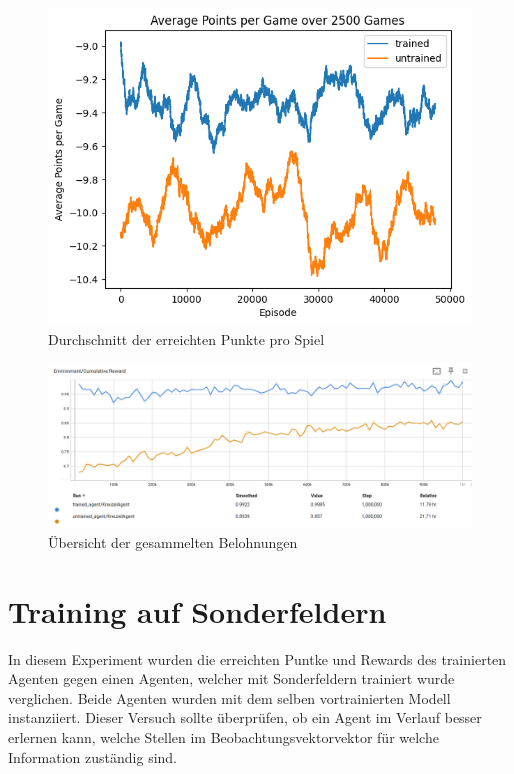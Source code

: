 \begin{figure}[!h]
    \centering
    \includegraphics[scale=0.6]{Bilder/points_trained_vs_untrained.png}
    \caption{Durchschnitt der erreichten Punkte pro Spiel }
    \label{fig:untrained_points}
\end{figure}
\begin{figure}[!h]
    \centering
    \includegraphics[scale=0.3]{Bilder/rewards_untrained.png}
    \caption{Übersicht der gesammelten Belohnungen}
    \label{fig:untrained_rewards}
\end{figure}

\newpage
\section{Training auf Sonderfeldern}
In diesem Experiment wurden die erreichten Puntke und Rewards des trainierten Agenten gegen einen Agenten, welcher mit Sonderfeldern trainiert wurde verglichen. Beide Agenten wurden mit dem selben vortrainierten Modell instanziiert. Dieser Versuch sollte überprüfen, ob ein Agent im Verlauf besser erlernen kann, welche Stellen im Beobachtungsvektorvektor für welche Information zuständig sind. 

